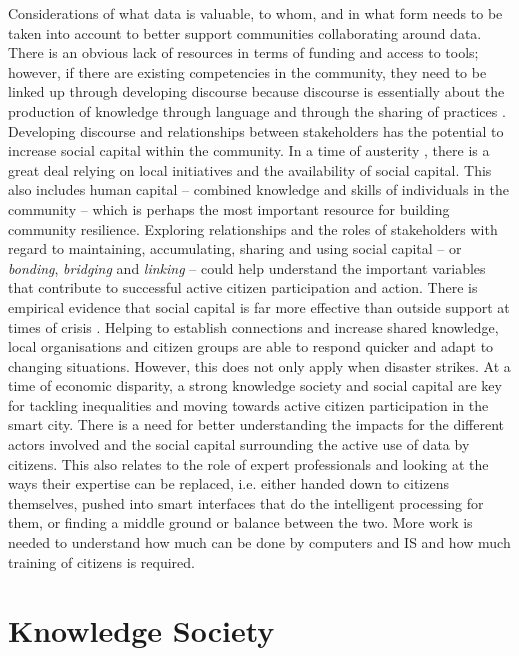 \noindent
Considerations of what data is valuable, to whom, and in what form needs to be taken into account to better support communities collaborating around data. There is an obvious lack of resources in terms of funding and access to tools; however, if there are existing competencies in the community, they need to be linked up through developing discourse because discourse is essentially about the production of knowledge through language and through the sharing of practices \citep{foucault_archaeology_1982}. Developing discourse and relationships between stakeholders has the potential to increase social capital within the community. In a time of austerity \citep{lowndes_local_2012}, there is a great deal relying on local initiatives and the availability of social capital. This also includes human capital \citep{coleman_social_1988} -- combined knowledge and skills of individuals in the community -- which is perhaps the most important resource for building community resilience. Exploring relationships and the roles of stakeholders with regard to maintaining, accumulating, sharing and using social capital -- or \textit{bonding}, \textit{bridging} and \textit{linking} \citep{granovetter_strength_1983} -- could help understand the important variables that contribute to successful active citizen participation and action. There is empirical evidence that social capital is far more effective than outside support at times of crisis \citep{morton_community_2013,aldrich_social_2015}. Helping to establish connections and increase shared knowledge, local organisations and citizen groups are able to respond quicker and adapt to changing situations. However, this does not only apply when disaster strikes. At a time of economic disparity, a strong knowledge society and social capital are key for tackling inequalities \citep[ch. 7]{lin_social_2004} and moving towards active citizen participation in the smart city. There is a need for better understanding the impacts for the different actors involved and the social capital surrounding the active use of data by citizens. This also relates to the role of expert professionals and looking at the ways their expertise can be replaced, i.e. either handed down to citizens themselves, pushed into smart interfaces that do the intelligent processing for them, or finding a middle ground or balance between the two. More work is needed to understand how much can be done by computers and IS and how much training of citizens is required.

\section{Knowledge Society}
\label{knowledge-society}

